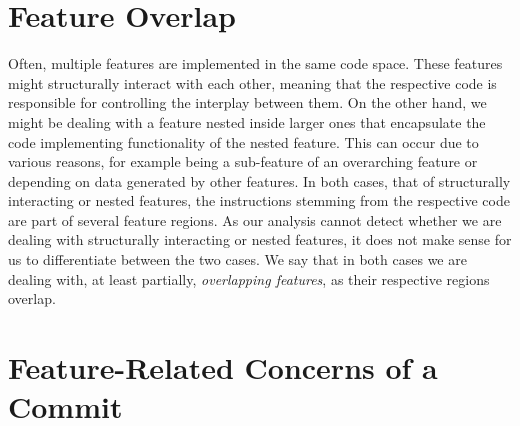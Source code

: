 \section{Feature Overlap}\label{sec:feature_overlap}

Often, multiple features are implemented in the same code space.
These features might structurally interact with each other, meaning that the respective code is responsible for controlling the interplay between them.
On the other hand, we might be dealing with a feature nested inside larger ones that encapsulate the code implementing functionality of the nested feature.
This can occur due to various reasons, for example being a sub-feature of an overarching feature or depending on data generated by other features.
In both cases, that of structurally interacting or nested features, the instructions stemming from the respective code are part of several feature regions.
As our analysis cannot detect whether we are dealing with structurally interacting or nested features, it does not make sense for us to differentiate between the two cases.
We say that in both cases we are dealing with, at least partially, \emph{overlapping features}, as their respective regions overlap.

\section{Feature-Related Concerns of a Commit}\label{sec:commit_concerns}

